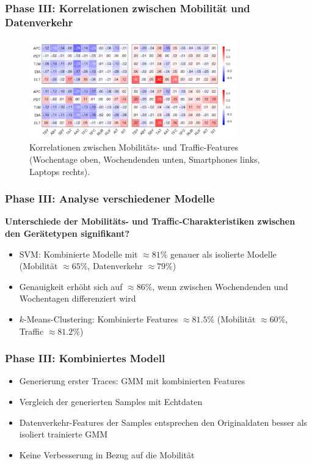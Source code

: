 \documentclass{beamer}
\begin{document}
\begin{frame}
  \frametitle{Phase III: Korrelationen zwischen Mobilität und Datenverkehr}
  \begin{figure}
    \centering
    \includegraphics[width=0.8\textwidth]{images/correlations.png}
    \caption*{Korrelationen zwischen Mobilitäts- und Traffic-Features (Wochentage oben, Wochendenden unten,
    Smartphones links, Laptops rechts).}
  \end{figure}
\end{frame}

\begin{frame}
  \frametitle{Phase III: Analyse verschiedener Modelle}
  \textbf{Unterschiede der Mobilitäts- und Traffic-Charakteristiken zwischen den Gerätetypen signifikant?}
  \begin{itemize}
    \item SVM: Kombinierte Modelle mit $\approx 81\%$ genauer als isolierte Modelle (Mobilität $\approx 65 \%$, Datenverkehr $\approx 79 \%$)
    \item Genauigkeit erhöht sich auf $\approx 86\%$, wenn zwischen Wochendenden und Wochentagen differenziert wird    
    \item $k$-Means-Clustering: Kombinierte Features $\approx81.5 \%$ (Mobilität $\approx 60 \%$, Traffic $\approx 81.2 \%$)
  \end{itemize}
\end{frame}

\begin{frame}
  \frametitle{Phase III: Kombiniertes Modell}
  \begin{itemize}
    \item Generierung erster Traces: GMM mit kombinierten Features
    \item Vergleich der generierten Samples mit Echtdaten
    \item Datenverkehr-Features der Samples entsprechen den Originaldaten besser als isoliert trainierte GMM
    \item Keine Verbesserung in Bezug auf die Mobilität
  \end{itemize}
\end{frame}
\end{document}

